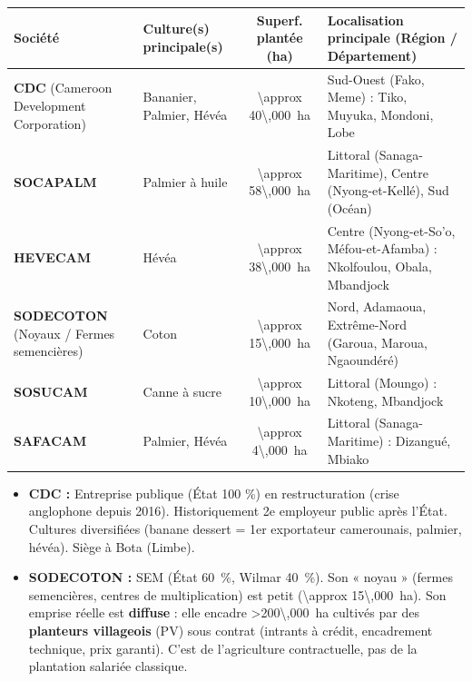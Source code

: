 \documentclass[11pt]{article}
\newcommand{\cle}[1]{{\popxbold\color{popdark}#1}}
\begin{document}
\begin{center}
\begin{tabularx}{\linewidth}{|l|X|c|X|}
\hline
\rowcolor{popblueL}
\textbf{Société} & \textbf{Culture(s) principale(s)} & \textbf{Superf. plantée (ha)} & \textbf{Localisation principale (Région / Département)} \\
\hline
\textbf{CDC} (Cameroon Development Corporation) & Bananier, Palmier, Hévéa & \SI{\approx 40\,000}{ha} & Sud-Ouest (Fako, Meme) : Tiko, Muyuka, Mondoni, Lobe \\
\hline
\textbf{SOCAPALM} & Palmier à huile & \SI{\approx 58\,000}{ha} & Littoral (Sanaga-Maritime), Centre (Nyong-et-Kellé), Sud (Océan) \\
\hline
\textbf{HEVECAM} & Hévéa & \SI{\approx 38\,000}{ha} & Centre (Nyong-et-So'o, Méfou-et-Afamba) : Nkolfoulou, Obala, Mbandjock \\
\hline
\textbf{SODECOTON} (Noyaux / Fermes semencières) & Coton & \SI{\approx 15\,000}{ha} & Nord, Adamaoua, Extrême-Nord (Garoua, Maroua, Ngaoundéré) \\
\hline
\textbf{SOSUCAM} & Canne à sucre & \SI{\approx 10\,000}{ha} & Littoral (Moungo) : Nkoteng, Mbandjock \\
\hline
\textbf{SAFACAM} & Palmier, Hévéa & \SI{\approx 4\,000}{ha} & Littoral (Sanaga-Maritime) : Dizangué, Mbiako \\
\hline
\end{tabularx}
\end{center}

\begin{attention}
\begin{itemize}
    \item \textbf{CDC :} Entreprise publique (État 100 \%) en restructuration (crise anglophone depuis 2016). Historiquement 2e employeur public après l'État. Cultures diversifiées (banane dessert = 1er exportateur camerounais, palmier, hévéa). Siège à Bota (Limbe).
    \item \textbf{SODECOTON :} SEM (État \SI{60}{\%}, Wilmar \SI{40}{\%}). Son « noyau » (fermes semencières, centres de multiplication) est petit (\SI{\approx 15\,000}{ha}). Son emprise réelle est \textbf{diffuse} : elle encadre \SI{>200\,000}{ha} cultivés par des \textbf{planteurs villageois} (PV) sous contrat (intrants à crédit, encadrement technique, prix garanti). C'est de l'\cle{agriculture contractuelle}, pas de la plantation salariée classique.
\end{itemize}
\end{attention}
\end{document}

